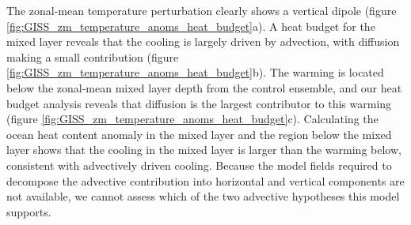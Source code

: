 \documentclass{ametsocV5}
\begin{document}
The zonal-mean temperature perturbation clearly shows a vertical dipole (figure \ref{fig:GISS_zm_temperature_anoms_heat_budget}a). A heat budget for the mixed layer reveals that the cooling is largely driven by advection, with diffusion making a small contribution (figure \ref{fig:GISS_zm_temperature_anoms_heat_budget}b). The warming is located below the zonal-mean mixed layer depth from the control ensemble, and our heat budget analysis reveals that diffusion is the largest contributor to this warming (figure \ref{fig:GISS_zm_temperature_anoms_heat_budget}c). Calculating the ocean heat content anomaly in the mixed layer and the region below the mixed layer shows that the cooling in the mixed layer is larger than the warming below, consistent with advectively driven cooling. Because the model fields required to decompose the advective contribution into horizontal and vertical components are not available, we cannot assess which of the two advective hypotheses this model supports. 


\end{document}
